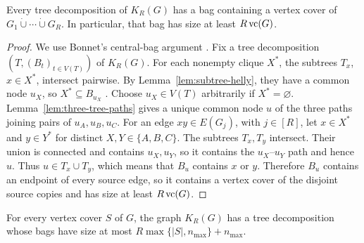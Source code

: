 \begin{lemma}\label{lem:tw-central-bag}
Every tree decomposition of $K_R(G)$ has a bag containing a vertex
cover of $G_1\mathbin{\dot\cup}\cdots\mathbin{\dot\cup}G_R$.
In particular, that bag has size at least $R\operatorname{vc}(G)$.
\end{lemma}

\begin{proof}
We use Bonnet's central-bag argument
\cite[proof of Lemma~6]{BonnetTreewidth}.
Fix a tree decomposition $(T,(B_t)_{t\in V(T)})$ of $K_R(G)$.
For each nonempty clique $X^*$, the subtrees $T_x$, $x\in X^*$,
intersect pairwise. By Lemma~\ref{lem:subtree-helly},
they have a common node $u_X$, so $X^*\subseteq B_{u_X}$
\cite[Lemma~4]{BonnetTreewidth}. Choose $u_X\in V(T)$ arbitrarily if
$X^*=\varnothing$. Lemma~\ref{lem:three-tree-paths} gives a unique
common node $u$ of the three paths joining pairs of
$u_A,u_B,u_C$.
For an edge $xy\in E(G_j)$, with $j\in[R]$, let
$x\in X^*$ and $y\in Y^*$ for distinct $X,Y\in\{A,B,C\}$.
The subtrees $T_x,T_y$ intersect. Their union is
connected and contains $u_X,u_Y$, so it contains the
$u_X$--$u_Y$ path and hence $u$. Thus $u\in T_x\cup T_y$,
which means that $B_u$ contains $x$ or $y$.
Therefore $B_u$ contains an endpoint of every source edge,
so it contains a vertex cover of the disjoint source copies
and has size at least $R\operatorname{vc}(G)$.
\end{proof}

\begin{lemma}\label{lem:tw-cover-decomposition}
For every vertex cover $S$ of $G$, the graph $K_R(G)$ has a tree
decomposition whose bags have size at most
$R\max\{|S|,n_{\max}\}+n_{\max}$.
\end{lemma}

